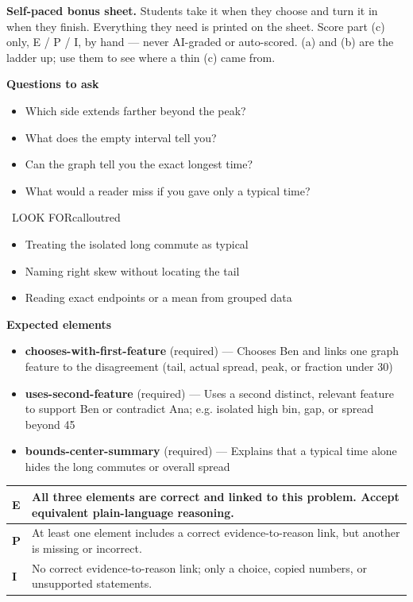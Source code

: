 \documentclass[11pt]{article}
\begin{document}
\textbf{Self-paced bonus sheet.} Students take it when they choose and turn it in when they finish. Everything they need is printed on the sheet. Score part (c) only, E / P / I, by hand --- never AI-graded or auto-scored. (a) and (b) are the ladder up; use them to see where a thin (c) came from.\par

\textbf{Questions to ask}
\begin{itemize}[leftmargin=1.5em,itemsep=2pt,topsep=2pt]
  \item Which side extends farther beyond the peak?
  \item What does the empty interval tell you?
  \item Can the graph tell you the exact longest time?
  \item What would a reader miss if you gave only a typical time?
\end{itemize}

\begin{callout}{\IconWarn\ LOOK FOR}{calloutred}
\begin{itemize}[leftmargin=1.5em,itemsep=2pt,topsep=2pt]
  \item Treating the isolated long commute as typical
  \item Naming right skew without locating the tail
  \item Reading exact endpoints or a mean from grouped data
\end{itemize}
\end{callout}


\textbf{Expected elements}
\begin{itemize}[leftmargin=1.5em,itemsep=2pt,topsep=2pt]
  \item \textbf{chooses-with-first-feature} (required) --- Chooses Ben and links one graph feature to the disagreement (tail, actual spread, peak, or fraction under 30)
  \item \textbf{uses-second-feature} (required) --- Uses a second distinct, relevant feature to support Ben or contradict Ana; e.g. isolated high bin, gap, or spread beyond 45
  \item \textbf{bounds-center-summary} (required) --- Explains that a typical time alone hides the long commutes or overall spread
\end{itemize}

{\small\renewcommand{\arraystretch}{1.25}
\noindent\begin{tabular}{|p{0.5in}|p{5.9in}|}
\hline
\textbf{E} & All three elements are correct and linked to this problem. Accept equivalent plain-language reasoning. \\ \hline
\textbf{P} & At least one element includes a correct evidence-to-reason link, but another is missing or incorrect. \\ \hline
\textbf{I} & No correct evidence-to-reason link; only a choice, copied numbers, or unsupported statements. \\ \hline
\end{tabular}}
\end{document}
